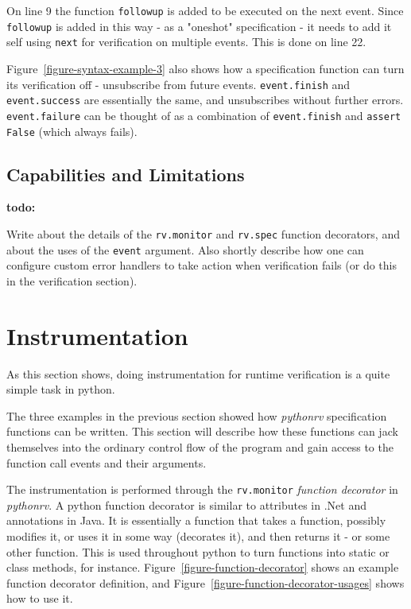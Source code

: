 \documentclass[a4paper,11pt]{kth-mag}
\newcommand{\todo}[1]{\textbf{todo: #1}}
\begin{document}
On line 9 the function \texttt{followup} is added to be executed on the next
event. Since \texttt{followup} is added in this way - as a "oneshot"
specification - it needs to add it self using \texttt{next} for verification on
multiple events. This is done on line 22.

Figure~\ref{figure-syntax-example-3} also shows how a specification function
can turn its verification off - unsubscribe from future events.
\texttt{event.finish} and \texttt{event.success} are essentially the same, and
unsubscribes without further errors. \texttt{event.failure} can be thought of
as a combination of \texttt{event.finish} and \texttt{assert False} (which
always fails).



\subsection{Capabilities and Limitations}

\todo{}

Write about the details of the \texttt{rv.monitor} and \texttt{rv.spec}
function decorators, and about the uses of the \texttt{event} argument. Also
shortly describe how one can configure custom error handlers to take action
when verification fails (or do this in the verification section).



\section{Instrumentation} \label{section-approach-instrumentation}

As this section shows, doing instrumentation for runtime verification is a
quite simple task in python.

The three examples in the previous section showed how \textit{pythonrv}
specification functions can be written. This section will describe how these
functions can jack themselves into the ordinary control flow of the program and
gain access to the function call events and their arguments.

The instrumentation is performed through the \texttt{rv.monitor}
\textit{function decorator} in \textit{pythonrv}. A python function decorator
is similar to attributes in .Net and annotations in Java. It is essentially a
function that takes a function, possibly modifies it, or uses it in some way
(decorates it), and then returns it - or some other function. This is used
throughout python to turn functions into static or class methods, for instance.
Figure~\ref{figure-function-decorator} shows an example function decorator
definition, and Figure~\ref{figure-function-decorator-usages} shows how to use
it.
\end{document}

